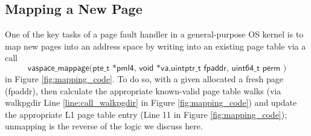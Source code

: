 \subsection{Mapping a New Page}
\label{sec:mapnew}
One of the key tasks of a page fault handler in a general-purpose OS kernel is
to map new pages into an address space by writing into an existing page table via a call
\[\textsf{vaspace\_mappage(pte\_t *pml4, void *va,uintptr\_t fpaddr, uint64\_t perm )}\] in Figure \ref{fig:mapping_code}.
To do so, with a given allocated a fresh page (\textsf{fpaddr}), then calculate the appropriate
known-valid page table walks (via \textsf{walkpgdir} Line \ref{line:call_walkpgdir} in Figure \ref{fig:mapping_code})  and update 
the appropriate L1 page table entry (Line 11 in Figure \ref{fig:mapping_code});
unmapping is the reverse of the logic we discuss here.
